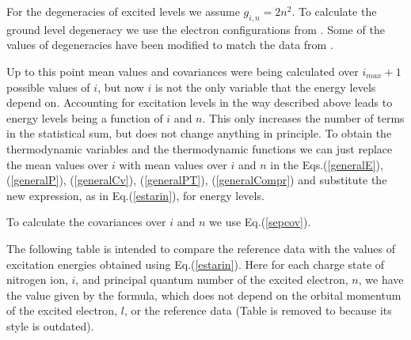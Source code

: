 For the degeneracies of excited levels we assume $g_{i,n} = 2 n^2$. To calculate the
ground level degeneracy we use the electron configurations from \cite{Carlson}.
Some of the values of degeneracies have been modified to match the data from \cite{allenAQ}.

Up to this point mean values and covariances were being calculated over $i_{max}+1$ possible
values of $i$, but now $i$ is not the only variable that the energy levels depend on.
Accounting for excitation levels in the way described above leads to energy levels
being a function of $i$ and $n$.
This only increases the number of terms in the statistical sum, but does not change
anything in principle. To obtain the thermodynamic variables and the thermodynamic functions
we can just replace the mean values over $i$ with mean values over $i$ and $n$ in the
Eqs.(\ref{generalE}), (\ref{generalP}), (\ref{generalCv}),
(\ref{generalPT}), (\ref{generalCompr}) and substitute the new expression, as in Eq.(\ref{estarin}), 
for energy levels.

To calculate the covariances over $i$ and $n$ we use Eq.(\ref{sepcov}).

The following table is intended to compare the reference data with
the values of excitation energies obtained using Eq.(\ref{estarin}). Here for each
charge state of nitrogen ion, $i$, and principal quantum number of the excited
electron, $n$, we have the value given by the formula, which does not depend on the
orbital momentum of the excited electron, $l$, or the reference data (Table is removed to
because its style is outdated).

%
